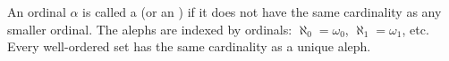 An ordinal $\alpha$ is called a  (or an ) if it does not have the same cardinality as any smaller ordinal. The alephs are indexed by ordinals: $\aleph_0 = \omega_0$, $\aleph_1 = \omega_1$, etc. Every well-ordered set has the same cardinality as a unique aleph.

